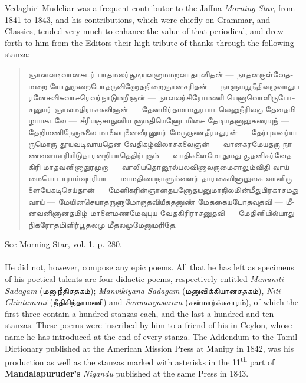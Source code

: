 \documentclass{article}
\newcommand{\TamilText}[1]{\texttamil{#1}}
\newcommand{\tam}[1]{\TamilText{#1}}
\begin{document}
Vedaghiri Mudeliar was a frequent contributor to the Jaffna \emph{Morning Star}, from 1841 to 1843, and his contributions, which were chiefly on Grammar, and Classics, tended very much to enhance the value of that periodical, and drew forth to him from the Editors their high tribute of thanks through the following stanza:---
\begin{quotation}\small
\tam{ஞானவடிவானசுடர்‌ பாதமலர்சூடியவனாமமறவாதபுனிதன்‌} --- \tam{நாதனருள்வேதமறை யோதுமுறைபோதருவினோதநிறைஞானசரிதன்‌} --- \tam{நாளுமநுநீதிவழுவாதுபரனேசவிசுவாசரெவர்நாடுமறிஞன்‌} --- \tam{நாவலர்சிரோமணி யெனாவொளிருபோசனுயர்‌ ஞாலமதிராசகவிஞன்} --- \tam{தேனமிர்தமாமதுரபாடலெனுநீரிலகு தேவதமிழாயகடலே} --- \tam{சீரியகுசாநுனிய னாமதியெனோடமிசை தேடியதனாலுகரையுந்} --- \tam{தேறிமணிநேருகலை மாலைபுனைவீரனுயர்‌ மேருகுணதீரசதுரன்‌} --- \tam{தேர்புலவர்யாருமொரு தூயவடிவாயதென வேதிகழ்விலாசகலைஞன்‌} --- \tam{வானகரமேயதரு நாணவளமாரியிடுதாரனறியாதெதிர்புகும்‌} --- \tam{வாதிகளைமோதுமது சூதனிகர்வேதகிரி மாதவனினாதுரமுறா} --- \tam{வாலியதொனூல்பலவினாலருமைசாலும்விதி வாய்மையொடாராய்வுபுரியா} --- \tam{மாமதியைநாளும்வளர்‌ தாரகையினாலுலக வானிருளையேகடிசெய்தான்‌} --- \tam{மேனிகரின்ஞானதபனோதயனுமாநிலமின்மீதுபிரகாசமதுவாய்‌} --- \tam{மேயினசெயாதருளுமோருதவியீததனுண்‌ மேதகையபோதவுதவி} --- \tam{மீனவனினானதமிழ்‌ மானைமணமேவுபுய வேதகிரிராசனுதவி} --- \tam{மேதினியில்‌யாதுநிகரோதமிளிர்பூதலமு மீதலமுமேனுமரிதே}.
\end{quotation}
\begin{flushright}See Morning Star, vol. 1. p. 280.\end{flushright}
\paragraph{}
He did not, however, compose any epic poems. All that he has left as specimens of his poetical talents are four didactic poems, respectively entitled \emph{Manun\={i}ti Sadagam} (\tam{மனுநீதிசதகம்}); \emph{Manvikiy\={a}na Sadagam} (\tam{மனுவிக்கியானசதகம்}), \emph{N\={i}ti Chint\={a}mani} (\tam{நீதிசிந்தாமணி}) and \emph{Sanm\={a}rgas\={a}ram} (\tam{சன்மார்க்கசாரம்}), of which the first three contain a hundred stanzas each, and the last a hundred and ten stanzas. These poems were inscribed by him to a friend of his in Ceylon, whose name he has introduced at the end of every stanza. The Addendum to the Tamil Dictionary published at the American Mission Press at Manipy in 1842, was his production as well as the stanzas marked with asterisks in the 11\textsuperscript{th} part of \textbf{Mandalapuruder's} \emph{Nigandu} published at the same Press in 1843.
\end{document}
